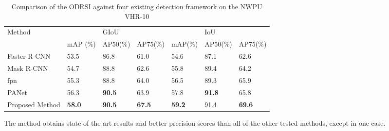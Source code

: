 \begin{table}[h!]
	\centering
	\begin{tabular}{@{}lllllll@{}}
		\toprule
		Method       &               & GIoU          &               &               & IoU           &               \\ \cmidrule(l){2-7} 
		             & mAP (\%)      & AP50(\%)      & AP75(\%)      & mAP(\%)       & AP50(\%)      & AP75(\%)      \\ \midrule
			     Faster R-CNN & 53.5          & 86.8          & 61.0          & 54.6          & 87.1          & 62.6          \\
			     Mask R-CNN   & 54.7          & 88.8          & 62.6          & 55.8          & 89.4          & 64.2          \\
			     \gls{fpn}          & 55.3          & 88.8          & 64.0          & 56.5          & 89.3          & 65.9          \\
			     PANet        & 56.3          & \textbf{90.5} & 63.9          & 57.8          & \textbf{91.8} & 65.8          \\
			     Proposed Method& \textbf{58.0} & \textbf{90.5} & \textbf{67.5} & \textbf{59.2} & 91.4          & \textbf{69.6} \\ \bottomrule
	\end{tabular}
	\caption{Comparison of the ODRSI against four existing detection framework on the NWPU VHR-10}
	\label{tab:ODRSIcomparison}
\end{table}

The method obtains state of the art results and better precision scores than all of the other tested methods, except in one case. 

\clearpage
